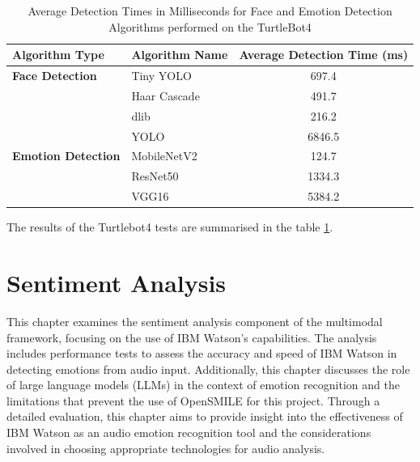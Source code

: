 \begin{table}[h!]
\centering{}
\caption{Average Detection Times in Milliseconds for Face and Emotion Detection Algorithms performed on the TurtleBot4}
\begin{tabular}{|l|l|c|}
\hline
\textbf{Algorithm Type} & \textbf{Algorithm Name} & \textbf{Average Detection Time (ms)} \\ \hline
\textbf{Face Detection} & Tiny YOLO               & 697.4                                \\ \cline{2-3}
                        & Haar Cascade            & 491.7                                \\ \cline{2-3}
                        & dlib                    & 216.2                                \\ \cline{2-3}
                        & YOLO                    & 6846.5                               \\ \hline
\textbf{Emotion Detection} & MobileNetV2          & 124.7                                \\ \cline{2-3}
                        & ResNet50                & 1334.3                               \\ \cline{2-3}
                        & VGG16                   & 5384.2                               \\ \hline
\end{tabular}
\label{tab:algorithm_detection_times_ms_robot}
\end{table}

The results of the Turtlebot4 tests are summarised in the table \ref{tab:algorithm_detection_times_ms_robot}.

\section{Sentiment Analysis}

This chapter examines the sentiment analysis component of the multimodal framework, focusing on the use of IBM Watson's capabilities. The analysis includes performance tests to assess the accuracy and speed of IBM Watson in detecting emotions from audio input. Additionally, this chapter discusses the role of large language models (LLMs) in the context of emotion recognition and the limitations that prevent the use of OpenSMILE for this project. Through a detailed evaluation, this chapter aims to provide insight into the effectiveness of IBM Watson as an audio emotion recognition tool and the considerations involved in choosing appropriate technologies for audio analysis.

